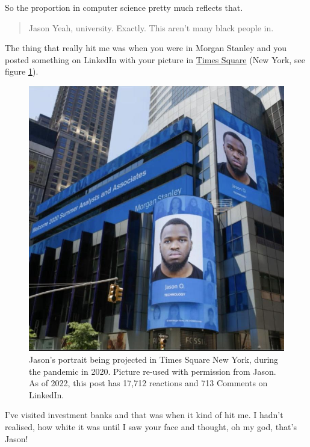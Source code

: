 \documentclass[
]{book}
\begin{document}
So the proportion in computer science pretty much reflects that.

\begin{quote}
Jason Yeah, university. Exactly. This aren't many black people in.
\end{quote}

The thing that really hit me was when you were in Morgan Stanley and you posted something on LinkedIn \citep{jasontimes} with your picture in \href{https://en.wikipedia.org/wiki/Times_Square}{Times Square} (New York, see figure \ref{fig:timesq-fig}).

\begin{figure}

{\centering \includegraphics[width=0.99\linewidth]{images/jason-times-square} 

}

\caption{Jason's portrait being projected in Times Square New York, during the pandemic in 2020. Picture re-used with permission from Jason. As of 2022, this post has 17,712 reactions and 713 Comments on LinkedIn. \citep{jasontimes}}\label{fig:timesq-fig}
\end{figure}



I've visited investment banks and that was when it kind of hit me. I hadn't realised, how white it was until I saw your face and thought, oh my god, that's Jason!
\end{document}
